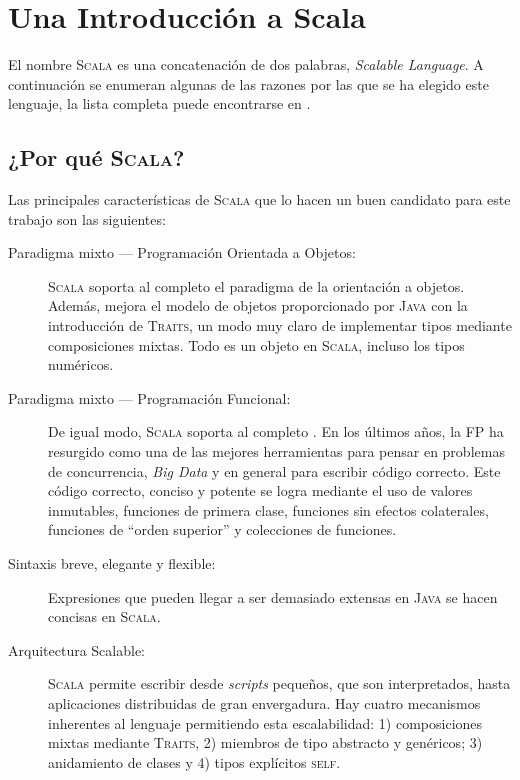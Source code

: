 \chapter{Una Introducción a Scala}
\label{ch:scalaintro}

El nombre \textsc{Scala} es una concatenación de dos palabras, \emph{Scalable
  Language}. A continuación se enumeran algunas de las razones por las que se ha
elegido este lenguaje, la lista completa puede encontrarse en
\citeauthor{Dean2015} \cite{Dean2015}.

\section{¿Por qué \textsc{Scala}?}
\label{sec:whyscala}

Las principales características de \textsc{Scala} que lo hacen un buen candidato
para este trabajo son las siguientes:

\begin{description}
\item[Paradigma mixto --- Programación Orientada a Objetos:] \textsc{Scala}
  soporta al completo el paradigma de la orientación a objetos. Además, mejora
  el modelo de objetos proporcionado por \textsc{Java} con la introducción de
  \textsc{Traits}, un modo muy claro de implementar tipos mediante composiciones
  mixtas. Todo es un objeto en \textsc{Scala}, incluso los tipos numéricos.
\item [Paradigma mixto --- Programación Funcional:] De igual modo,
  \textsc{Scala} soporta al completo . En los últimos años, la \ac{FP} ha resurgido como
  una de las mejores herramientas para pensar en problemas de concurrencia,
  \emph{Big Data} y en general para escribir código correcto. Este código
  correcto, conciso y potente se logra mediante el uso de valores inmutables,
  funciones de primera clase, funciones sin efectos colaterales, funciones de
  ``orden superior'' y colecciones de funciones.
\item [Sintaxis breve, elegante y flexible:] Expresiones que pueden llegar a
  ser demasiado extensas en \textsc{Java} se hacen concisas en \textsc{Scala}.
\item [Arquitectura Scalable:] \textsc{Scala} permite escribir desde
  \emph{scripts} pequeños, que son interpretados, hasta aplicaciones
  distribuidas de gran envergadura. Hay cuatro mecanismos inherentes al lenguaje
  permitiendo esta escalabilidad: 1) composiciones mixtas mediante
  \textsc{Traits}, 2) miembros de tipo abstracto y genéricos; 3) anidamiento de
  clases y 4) tipos explícitos \textsc{self}.
\end{description}

